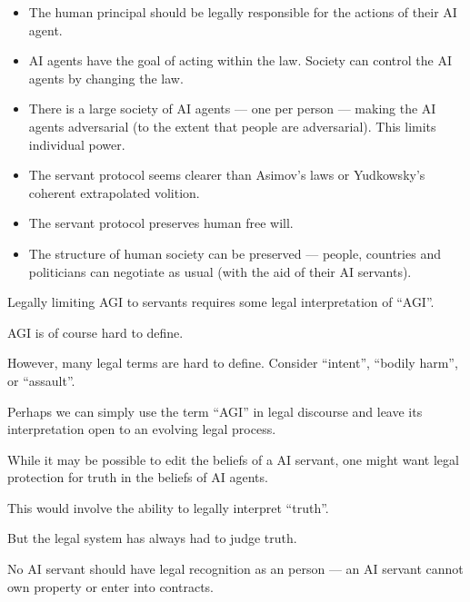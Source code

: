{\begin{itemize}
\vfill
\item The human principal should be legally responsible for the actions of their AI agent.

\vfill
\item AI agents have the goal of acting within the law. Society can control the AI agents by changing the law.

\vfill
\item There is a large society of AI agents --- one per person --- making the AI agents adversarial (to the extent that people are adversarial).
This limits individual power.
\end{itemize}


\begin{itemize}
\item The servant protocol seems clearer than Asimov’s laws or Yudkowsky's coherent extrapolated volition.

\vfill
\item The servant protocol preserves human free will.

\vfill
\item The structure of human society can be preserved --- people, countries and politicians can negotiate as usual (with the aid of their AI servants).
\end{itemize}


Legally limiting AGI to servants requires some legal interpretation of ``AGI''.

\vfill
AGI is of course hard to define.

\vfill
However, many legal terms are hard to define.  Consider ``intent'', ``bodily harm'', or ``assault''.

\vfill
Perhaps we can simply use the term ``AGI'' in legal discourse and leave its interpretation open to an evolving legal process.


While it may be possible to edit the beliefs of a AI servant, one might want legal protection for truth in the beliefs of AI agents.

\vfill
This would involve the ability to legally interpret ``truth''.

\vfill
But the legal system has always had to judge truth.


No AI servant should have legal recognition as an person --- an AI servant cannot own property or enter into contracts.

}
